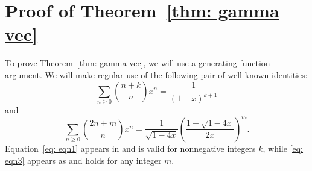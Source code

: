 \documentclass{amsart}
\numberwithin{equation}{section}
\theoremstyle{plain}
\theoremstyle{definition}
\DeclareMathOperator{\md}{mod}
\begin{document}


\section{Proof of Theorem~\ref{thm: gamma vec}}\label{sec: proof2}

To prove Theorem~\ref{thm: gamma vec}, we will use a generating function argument.
We will make regular use of the following pair of well-known identities:
\begin{equation}\label{eq: eqn1}
    \sum_{n \geq 0} \binom{n+k}{n} x^n =  \frac{1}{(1-x)^{k+1}}
\end{equation}
and
\begin{equation}\label{eq: eqn3}
    \sum_{n \geq 0} \binom{2n+m}{n} x^n =  \frac{1}{\sqrt{1-4x}}
    \left(\frac{1-\sqrt{1-4x}}{2x}\right)^m.
\end{equation}
Equation~\eqref{eq: eqn1} appears in \cite[Table 335]{GrahamKnuthPatashnik} and is valid for nonnegative integers $k$, while \eqref{eq: eqn3} appears as \cite[Equation (5.72)]{GrahamKnuthPatashnik} and holds for any integer $m$.
\end{document}
